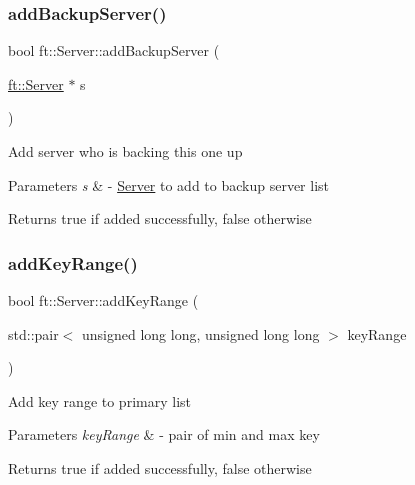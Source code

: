 \subsubsection{\texorpdfstring{add\+Backup\+Server()}{addBackupServer()}}
{\footnotesize\ttfamily bool ft\+::\+Server\+::add\+Backup\+Server (\begin{DoxyParamCaption}\item[{\mbox{\hyperlink{classft_1_1Server}{ft\+::\+Server}} $\ast$}]{s }\end{DoxyParamCaption})}

Add server who is backing this one up


\begin{DoxyParams}{Parameters}
{\em s} & -\/ \mbox{\hyperlink{classft_1_1Server}{Server}} to add to backup server list\\
\hline
\end{DoxyParams}
\begin{DoxyReturn}{Returns}
true if added successfully, false otherwise 
\end{DoxyReturn}
\mbox{\label{classft_1_1Server_a5f5dd98bd5956bb480f4e8564c7620cd}} 
\subsubsection{\texorpdfstring{add\+Key\+Range()}{addKeyRange()}}
{\footnotesize\ttfamily bool ft\+::\+Server\+::add\+Key\+Range (\begin{DoxyParamCaption}\item[{std\+::pair$<$ unsigned long long, unsigned long long $>$}]{key\+Range }\end{DoxyParamCaption})}

Add key range to primary list


\begin{DoxyParams}{Parameters}
{\em key\+Range} & -\/ pair of min and max key\\
\hline
\end{DoxyParams}
\begin{DoxyReturn}{Returns}
true if added successfully, false otherwise 
\end{DoxyReturn}
\mbox{\label{classft_1_1Server_a395dbe95b7c78b48213a62b4bc2d7c9d}} 
